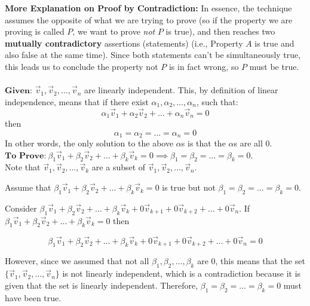 {    \textbf{More Explanation on Proof by Contradiction:} In essence, the technique assumes the opposite of what we are trying to prove (so if the property we are proving is called $P$, we want to prove \textit{not} $P$ is true), and then reaches two \textbf{mutually contradictory} assertions (statements) (i.e., Property $A$ is true and also false at the same time). Since both statements can't be simultaneously true, this leads us to conclude the property not $P$ is in fact wrong, so $P$ must be true. \\ \\
	$\textbf{Given:}$
	$\vec{v}_1, \vec{v}_2, \ldots, \vec{v}_n$ are linearly independent. This, by definition of linear independence, means that if there exist $\alpha_1, \alpha_2, \ldots, \alpha_n$, such that:
	 $$\alpha_1\vec{v}_1 + \alpha_2\vec{v}_2 + \ldots + \alpha_n\vec{v}_n = 0$$ then  $$\alpha_1=\alpha_2=\ldots=\alpha_n=0$$ 
	 In other words, the only solution to the above $\alpha$s is that the $\alpha$s are all $0$.\\
	$\textbf{To Prove:}\ \beta_1\vec{v}_1 + \beta_2\vec{v}_2 + \ldots + \beta_k\vec{v}_k = 0 \implies \beta_1=\beta_2=\ldots=\beta_k=0$. \\ Note that $\vec{v}_1, \vec{v}_2, \ldots, \vec{v}_k$ are a subset of $\vec{v}_1, \vec{v}_2, \ldots, \vec{v}_n$.

	Assume that $ \beta_1\vec{v}_1 + \beta_2\vec{v}_2 + \ldots + \beta_k\vec{v}_k = 0 $ is true but not $\beta_1=\beta_2=\ldots=\beta_k=0$. 

	Consider $\beta_1\vec{v}_1 + \beta_2\vec{v}_2 + \ldots + \beta_k\vec{v}_k + 0\vec{v}_{k+1} + 0\vec{v}_{k+2} + \ldots + 0\vec{v}_n$. If $\beta_1\vec{v}_1 + \beta_2\vec{v}_2 + \ldots + \beta_k\vec{v}_k = 0$ then 

	$$\beta_1\vec{v}_1 + \beta_2\vec{v}_2 + \ldots + \beta_k\vec{v}_k + 0\vec{v}_{k+1} + 0\vec{v}_{k+2} + \ldots + 0\vec{v}_n = 0$$ 

	However, since we assumed that not all $\beta_1, \beta_2, \ldots, \beta_k$ are 0, this means that the set $\{\vec{v}_1, \vec{v}_2, \ldots, \vec{v}_n\}$ is not linearly independent, which is a contradiction because it is given that the set is linearly independent. Therefore, $\beta_1=\beta_2=\ldots=\beta_k=0$ must have been true. 
}